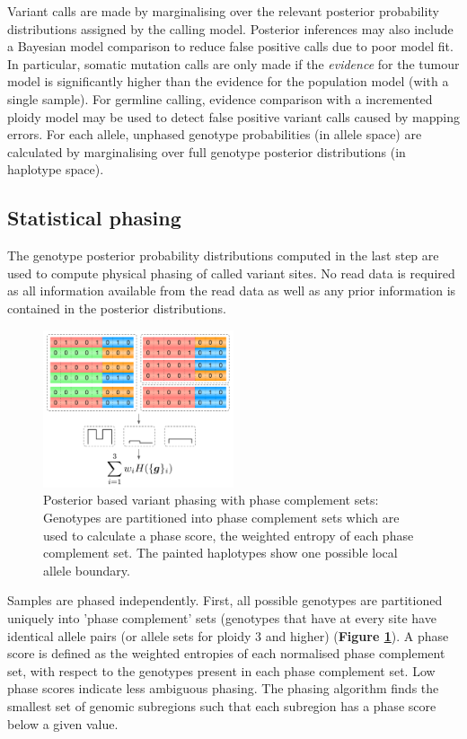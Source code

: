 \documentclass[notitlepage, twocolumn]{article}
\begin{document}
Variant calls are made by marginalising over the relevant posterior probability distributions assigned by the calling model. Posterior inferences may also include a Bayesian model comparison to reduce false positive calls due to poor model fit. In particular, somatic mutation calls are only made if the \emph{evidence} for the tumour model is significantly higher than the evidence for the population model (with a single sample). For germline calling, evidence comparison with a incremented ploidy model may be used to detect false positive variant calls caused by mapping errors. For each allele, unphased genotype probabilities (in allele space) are calculated by marginalising over full genotype posterior distributions (in haplotype space).

\subsection*{Statistical phasing}

The genotype posterior probability distributions computed in the last step are used to compute physical phasing of called variant sites. No read data is required as all information available from the read data as well as any prior information is contained in the posterior distributions.

\begin{figure}[h]
\centering
\includegraphics[width=0.5\textwidth]{figures/phasing}
\caption{Posterior based variant phasing with phase complement sets: Genotypes are partitioned into phase complement sets which are used to calculate a phase score, the weighted entropy of each phase complement set. The painted haplotypes show one possible local allele boundary.}
\label{fig:phasing}
\vspace{-1.5em}
\end{figure}

Samples are phased independently. First, all possible genotypes are partitioned uniquely into 'phase complement' sets (genotypes that have at every site have identical allele pairs (or allele sets for ploidy $3$ and higher) (\textbf{Figure \ref{fig:phasing}}). A phase score is defined as the weighted entropies of each normalised phase complement set, with respect to the genotypes present in each phase complement set. Low phase scores indicate less ambiguous phasing. The phasing algorithm finds the smallest set of genomic subregions such that each subregion has a phase score below a given value. 
\end{document}
